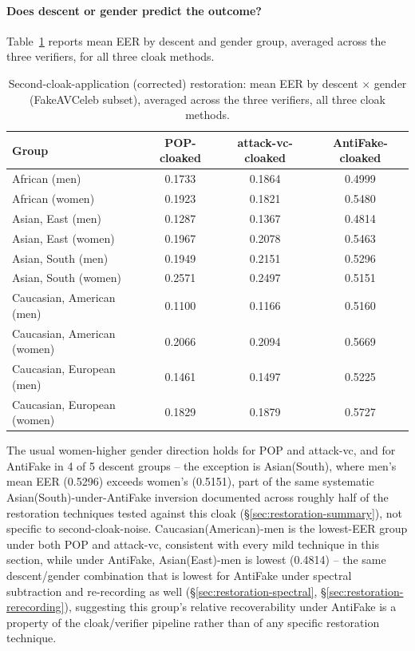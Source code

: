 \documentclass[11pt]{article}
\begin{document}
\paragraph{Does descent or gender predict the outcome?}
Table~\ref{tab:restoration-secondcloak-demographics} reports mean EER
by descent and gender group, averaged across the three verifiers, for
all three cloak methods.

\begin{table}[H]
\centering
\caption{Second-cloak-application (corrected) restoration: mean EER by
descent $\times$ gender (FakeAVCeleb subset), averaged across the three
verifiers, all three cloak methods.}
\label{tab:restoration-secondcloak-demographics}
\begin{tabular}{lccc}
\toprule
Group & POP-cloaked & attack-vc-cloaked & AntiFake-cloaked \\
\midrule
African (men)               & 0.1733 & 0.1864 & 0.4999 \\
African (women)              & 0.1923 & 0.1821 & 0.5480 \\
Asian, East (men)            & 0.1287 & 0.1367 & 0.4814 \\
Asian, East (women)          & 0.1967 & 0.2078 & 0.5463 \\
Asian, South (men)           & 0.1949 & 0.2151 & 0.5296 \\
Asian, South (women)         & 0.2571 & 0.2497 & 0.5151 \\
Caucasian, American (men)    & 0.1100 & 0.1166 & 0.5160 \\
Caucasian, American (women)  & 0.2066 & 0.2094 & 0.5669 \\
Caucasian, European (men)    & 0.1461 & 0.1497 & 0.5225 \\
Caucasian, European (women)  & 0.1829 & 0.1879 & 0.5727 \\
\bottomrule
\end{tabular}
\end{table}

The usual women-higher gender direction holds for POP and attack-vc,
and for AntiFake in 4 of 5 descent groups -- the exception is
Asian(South), where men's mean EER (0.5296) exceeds women's (0.5151),
part of the same systematic Asian(South)-under-AntiFake inversion
documented across roughly half of the restoration techniques tested
against this cloak (\S\ref{sec:restoration-summary}), not specific to
second-cloak-noise. Caucasian(American)-men is the lowest-EER group under
both POP and attack-vc, consistent with every mild technique in this
section, while under AntiFake, Asian(East)-men is lowest (0.4814) --
the same descent/gender combination that is lowest for AntiFake under
spectral subtraction and re-recording as well
(\S\ref{sec:restoration-spectral}, \S\ref{sec:restoration-rerecording}),
suggesting this group's relative recoverability under AntiFake is a
property of the cloak/verifier pipeline rather than of any specific
restoration technique.
\end{document}
